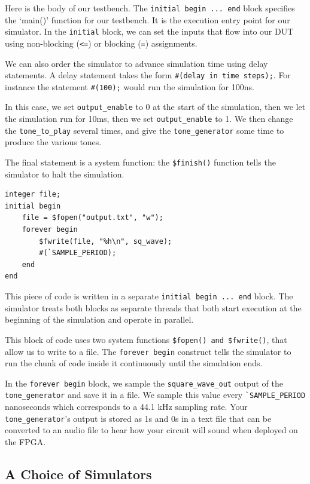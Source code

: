 \documentclass[11pt]{article}
\begin{document}
Here is the body of our testbench. The \verb|initial begin ... end| block specifies the `main()' function for our testbench. It is the execution entry point for our simulator. In the \verb|initial| block, we can set the inputs that flow into our DUT using non-blocking (\verb|<=|) or blocking (\verb|=|) assignments.

We can also order the simulator to advance simulation time using delay statements. A delay statement takes the form \verb|#(delay in time steps);|. For instance the statement \verb|#(100);| would run the simulation for 100ns.

In this case, we set \verb|output_enable| to 0 at the start of the simulation, then we let the simulation run for 10ms, then we set \verb|output_enable| to 1. We then change the \verb|tone_to_play| several times, and give the \verb|tone_generator| some time to produce the various tones.


The final statement is a system function: the \verb|$finish()| function tells the simulator to halt the simulation.

\begin{verbatim}
integer file;
initial begin
	file = $fopen("output.txt", "w");
	forever begin
		$fwrite(file, "%h\n", sq_wave);
		#(`SAMPLE_PERIOD);
	end
end
\end{verbatim}

This piece of code is written in a separate \verb|initial begin ... end| block. The simulator treats both blocks as separate threads that both start execution at the beginning of the simulation and operate in parallel.

This block of code uses two system functions \verb|$fopen() and $fwrite()|, that allow us to write to a file. The \verb|forever begin| construct tells the simulator to run the chunk of code inside it continuously until the simulation ends.

In the \verb|forever begin| block, we sample the \verb|square_wave_out| output of the \verb|tone_generator| and save it in a file. We sample this value every \verb|`SAMPLE_PERIOD| nanoseconds which corresponds to a 44.1 kHz sampling rate. Your \verb|tone_generator|'s output is stored as 1s and 0s in a text file that can be converted to an audio file to hear how your circuit will sound when deployed on the FPGA.

\subsection{A Choice of Simulators}
\end{document}
